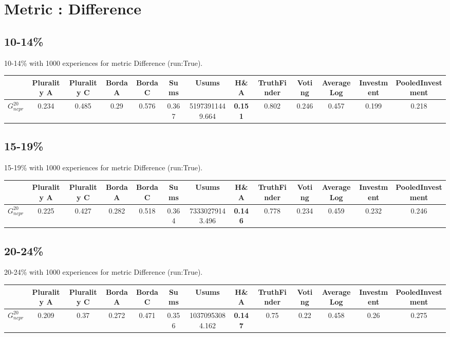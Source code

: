 \documentclass{article}
\newcommand{\graph}[2]{$G_{#1}^{#2}$}
\begin{document}
\section{Metric : Difference}

\newpage

\subsection{10-14\%}

10-14\% with 1000 experiences for metric Difference (run:True).

\noindent\begin{tabular}{|l|c|c|c|c|c|c|c|c|c|c|c|c|}
\hline
& Plurality A& Plurality C& Borda A& Borda C& Sums& Usums& H\&A& TruthFinder& Voting& AverageLog& Investment& PooledInvestment\\
\hline
\graph{ncpr}{20} &0.234&0.485&0.29&0.576&0.367&51973911449.664&\textbf{0.151}&0.802&0.246&0.457&0.199&0.218\\
\hline
\end{tabular}
\newpage

\subsection{15-19\%}

15-19\% with 1000 experiences for metric Difference (run:True).

\noindent\begin{tabular}{|l|c|c|c|c|c|c|c|c|c|c|c|c|}
\hline
& Plurality A& Plurality C& Borda A& Borda C& Sums& Usums& H\&A& TruthFinder& Voting& AverageLog& Investment& PooledInvestment\\
\hline
\graph{ncpr}{20} &0.225&0.427&0.282&0.518&0.364&73330279143.496&\textbf{0.146}&0.778&0.234&0.459&0.232&0.246\\
\hline
\end{tabular}
\newpage

\subsection{20-24\%}

20-24\% with 1000 experiences for metric Difference (run:True).

\noindent\begin{tabular}{|l|c|c|c|c|c|c|c|c|c|c|c|c|}
\hline
& Plurality A& Plurality C& Borda A& Borda C& Sums& Usums& H\&A& TruthFinder& Voting& AverageLog& Investment& PooledInvestment\\
\hline
\graph{ncpr}{20} &0.209&0.37&0.272&0.471&0.356&10370953084.162&\textbf{0.147}&0.75&0.22&0.458&0.26&0.275\\
\hline
\end{tabular}
\newpage
\end{document}
